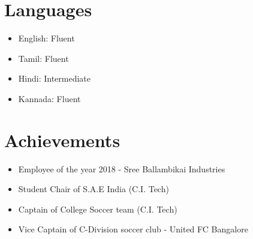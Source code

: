\documentclass[a4paper,10pt]{article}
\begin{document}
\begin{multicols}{2}
\section*{Languages}
\begin{itemize}
    \item English: Fluent
    \item Tamil: Fluent
    \item Hindi: Intermediate
    \item Kannada: Fluent
\end{itemize}

\section*{Achievements}
\begin{itemize}
    \item Employee of the year 2018 - Sree Ballambikai Industries
    \item Student Chair of S.A.E India (C.I. Tech)
    \item Captain of College Soccer team (C.I. Tech)
    \item Vice Captain of C-Division soccer club - United FC Bangalore
\end{itemize}

\end{multicols}
\end{document}
